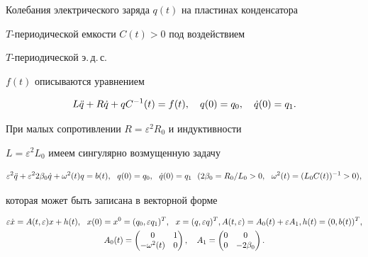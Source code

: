 \begin{examnonum}


Колебания электрического заряда $q(t)$ на пластинах конденсатора 


$T$-пе\-ри\-о\-ди\-чес\-кой емкости $C(t)>0$ под воздействием


$T$-периодической э.\,д.\,с. 


$ f(t)$ описываются уравнением


\begin{equation}


L\Ddot{q}+R\dot{q}+qC^{-1}(t)=f(t),\quad q(0)=q_0,\quad \Dot{q}(0)=q_1.


\end{equation}


При малых сопротивлении $R=\varepsilon^2R_0$ и индуктивности 


$L=\varepsilon^2L_0$ имеем сингулярно возмущенную задачу


$$


\varepsilon^2\Ddot{q}+\varepsilon^2 2\beta_0\Dot{q}+\omega^2(t)q=b(t),


\ \ q(0)=q_0,\ \ \Dot{q}(0)=q_1\ \ (2\beta_0=R_0/L_0>0,


\ \ \omega^2(t)=(L_0C(t))^{-1}>0),


$$


которая может быть записана в векторной форме 


\begin{gather}


\varepsilon\Dot{x}=A(t,\varepsilon)x+h(t),


\ \ x(0)=x^0=(q_0,\varepsilon q_1)^T,


\ \ x=(q,\varepsilon q)^T, A(t,\varepsilon)=A_0(t)+


\varepsilon A_1,h(t)=(0,b(t))^T, \\


%


A_0(t)=\begin{pmatrix}


0& 1 \\ -\omega^2(t)& 0 


\end{pmatrix},\quad


A_1=\begin{pmatrix}


0& 0 \\ 0& -2\beta_0 \end{pmatrix}.\notag


\end{gather}



\end{examnonum}
